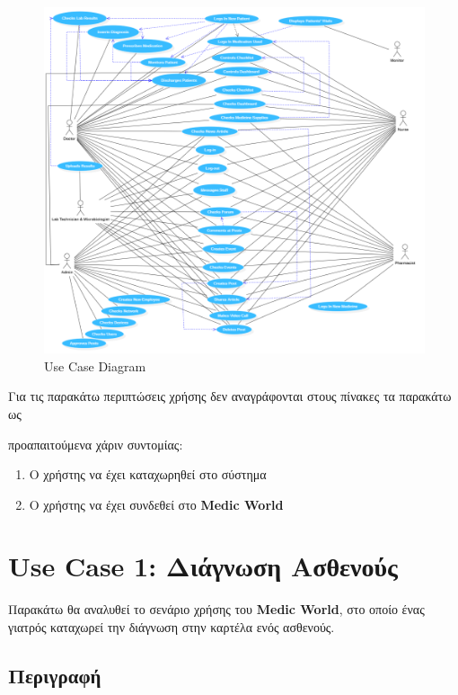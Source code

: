 \documentclass{article}
\begin{document}
\begin{figure}[!htb]
        \centering
        \includegraphics[width=1.0\textwidth]{UML.png}
        \caption{\label{fig: UML} Use Case Diagram}
\end{figure}
        
\vspace{0.5cm}

Για τις παρακάτω περιπτώσεις χρήσης δεν αναγράφονται στους πίνακες τα παρακάτω ως \par προαπαιτούμενα χάριν συντομίας:

\begin{enumerate}
    \item  Ο χρήστης να έχει καταχωρηθεί στο σύστημα
    \item Ο χρήστης να έχει συνδεθεί στο \textbf{Medic World}
\end{enumerate}


\section{Use Case 1: Διάγνωση Ασθενούς}

Παρακάτω θα αναλυθεί το σενάριο χρήσης του \textbf{Medic World}, στο οποίο ένας γιατρός καταχωρεί την διάγνωση στην καρτέλα ενός ασθενούς.

\subsection{Περιγραφή}
\end{document}
